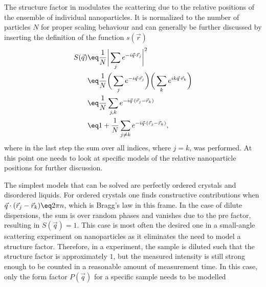 \documentclass[\main/dresen_thesis.tex]{subfiles}
\begin{document}
The structure factor in  modulates the scattering due to the relative positions of the ensemble of individual nanoparticles.
It is normalized to the number of particles $N$ for proper scaling behaviour and can generally be further discussed by inserting the definition of the function $s(\vec{r})$
\begin{align}
  S(\vec{q}) &\eq \frac{1}{N} \bigg| \sum_j  e^{-i\vec{q} \cdot \vec{r}_j} \bigg|^2\\
  &\eq \frac{1}{N}  \bigg( \sum_j  e^{-i\vec{q} \cdot \vec{r}_j} \bigg) \bigg( \sum_k  e^{i k\vec{q} \cdot \vec{r}_k} \bigg)\\
  &\eq \frac{1}{N}  \sum_{j, k}  e^{-i\vec{q} \cdot (\vec{r}_j - \vec{r}_k) }\\
  &\eq 1 + \frac{1}{N}  \sum_{j \neq k}  e^{-i\vec{q} \cdot (\vec{r}_j - \vec{r}_k)},
\end{align}
where in the last step the sum over all indices, where $j=k$, was performed.
At this point one needs to look at specific models of the relative nanoparticle positions for further discussion.

The simplest models that can be solved are perfectly ordered crystals and disordered liquids.
For ordered crystals one finds constructive contributions when $\vec{q} \cdot (\vec{r}_j - \vec{r}_k) \eq 2 \pi n$, which is Bragg's law in this frame.
In the case of dilute dispersions, the sum is over random phases and vanishes due to the pre factor, resulting in $S(\vec{q}) = 1$.
This case is most often the desired one in a small-angle scattering experiment on nanoparticles as it eliminates the need to model a structure factor.
Therefore, in a experiment, the sample is diluted such that the structure factor is approximately $1$, but the measured intensity is still strong enough to be counted in a reasonable amount of measurement time.
In this case, only the form factor $P(\vec{q})$ for a specific sample needs to be modelled
\end{document}
